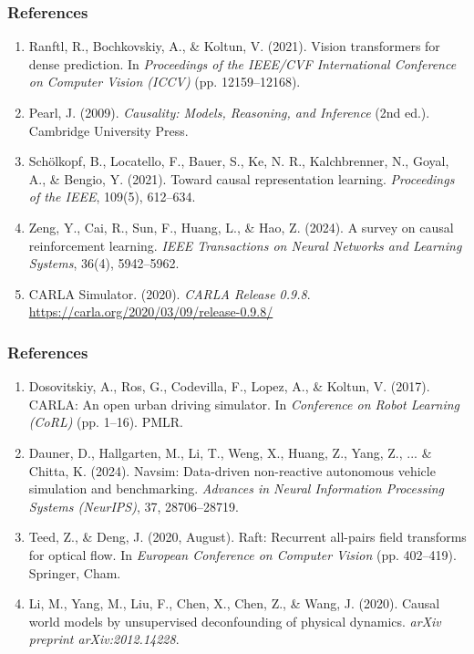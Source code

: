 \begin{frame}
  \frametitle{References}
  \begin{enumerate}
    \item[\hypertarget{ref:10}{[10]}] Ranftl, R., Bochkovskiy, A., \& Koltun, V. (2021). Vision transformers for dense prediction. In \textit{Proceedings of the IEEE/CVF International Conference on Computer Vision (ICCV)} (pp. 12159--12168).
    \item[\hypertarget{ref:11}{[11]}] Pearl, J. (2009). \textit{Causality: Models, Reasoning, and Inference} (2nd ed.). Cambridge University Press.
    \item[\hypertarget{ref:12}{[12]}] Schölkopf, B., Locatello, F., Bauer, S., Ke, N. R., Kalchbrenner, N., Goyal, A., \& Bengio, Y. (2021). Toward causal representation learning. \textit{Proceedings of the IEEE}, 109(5), 612--634.
    \item[\hypertarget{ref:13}{[13]}] Zeng, Y., Cai, R., Sun, F., Huang, L., \& Hao, Z. (2024). A survey on causal reinforcement learning. \textit{IEEE Transactions on Neural Networks and Learning Systems}, 36(4), 5942--5962.
    \item[\hypertarget{ref:14}{[14]}] CARLA Simulator. (2020). \textit{CARLA Release 0.9.8}. \url{https://carla.org/2020/03/09/release-0.9.8/}
  \end{enumerate}
\end{frame}

\begin{frame}
  \frametitle{References}
  \begin{enumerate}
    \item[\hypertarget{ref:15}{[15]}] Dosovitskiy, A., Ros, G., Codevilla, F., Lopez, A., \& Koltun, V. (2017). CARLA: An open urban driving simulator. In \textit{Conference on Robot Learning (CoRL)} (pp. 1--16). PMLR.
    \item[\hypertarget{ref:16}{[16]}] Dauner, D., Hallgarten, M., Li, T., Weng, X., Huang, Z., Yang, Z., ... \& Chitta, K. (2024). Navsim: Data-driven non-reactive autonomous vehicle simulation and benchmarking. \textit{Advances in Neural Information Processing Systems (NeurIPS)}, 37, 28706--28719.
    \item[\hypertarget{ref:17}{[17]}] Teed, Z., \& Deng, J. (2020, August). Raft: Recurrent all-pairs field transforms for optical flow. In \textit{European Conference on Computer Vision} (pp. 402--419). Springer, Cham.
    \item[\hypertarget{ref:18}{[18]}] Li, M., Yang, M., Liu, F., Chen, X., Chen, Z., \& Wang, J. (2020). Causal world models by unsupervised deconfounding of physical dynamics. \textit{arXiv preprint arXiv:2012.14228}.
  \end{enumerate}
\end{frame}

